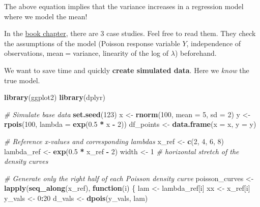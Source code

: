 \documentclass[
]{article}
\newenvironment{Shaded}{\begin{snugshade}}{\end{snugshade}}
\newcommand{\AttributeTok}[1]{\textcolor[rgb]{0.13,0.29,0.53}{#1}}
\newcommand{\CommentTok}[1]{\textcolor[rgb]{0.56,0.35,0.01}{\textit{#1}}}
\newcommand{\ControlFlowTok}[1]{\textcolor[rgb]{0.13,0.29,0.53}{\textbf{#1}}}
\newcommand{\DecValTok}[1]{\textcolor[rgb]{0.00,0.00,0.81}{#1}}
\newcommand{\FloatTok}[1]{\textcolor[rgb]{0.00,0.00,0.81}{#1}}
\newcommand{\FunctionTok}[1]{\textcolor[rgb]{0.13,0.29,0.53}{\textbf{#1}}}
\newcommand{\NormalTok}[1]{#1}
\newcommand{\OtherTok}[1]{\textcolor[rgb]{0.56,0.35,0.01}{#1}}
\newcommand{\SpecialCharTok}[1]{\textcolor[rgb]{0.81,0.36,0.00}{\textbf{#1}}}
\begin{document}
The above equation implies that the variance increases in a regression
model where we model the mean!

In the
\href{https://bookdown.org/roback/bookdown-BeyondMLR/ch-poissonreg.html}{book
chapter}, there are 3 case studies. Feel free to read them. They check
the assumptions of the model (Poisson response variable \(Y\),
independence of observations, mean\(=\)variance, linearity of the log of
\(\lambda\)) beforehand.

We want to save time and quickly \textbf{create simulated data}. Here we
\emph{know} the true model.

\begin{Shaded}
\begin{Highlighting}[]
\FunctionTok{library}\NormalTok{(ggplot2)}
\FunctionTok{library}\NormalTok{(dplyr)}

\CommentTok{\# Simulate base data}
\FunctionTok{set.seed}\NormalTok{(}\DecValTok{123}\NormalTok{)}
\NormalTok{x }\OtherTok{\textless{}{-}} \FunctionTok{rnorm}\NormalTok{(}\DecValTok{100}\NormalTok{, }\AttributeTok{mean =} \DecValTok{5}\NormalTok{, }\AttributeTok{sd =} \DecValTok{2}\NormalTok{)}
\NormalTok{y }\OtherTok{\textless{}{-}} \FunctionTok{rpois}\NormalTok{(}\DecValTok{100}\NormalTok{, }\AttributeTok{lambda =} \FunctionTok{exp}\NormalTok{(}\FloatTok{0.5} \SpecialCharTok{*}\NormalTok{ x }\SpecialCharTok{{-}} \DecValTok{2}\NormalTok{))}
\NormalTok{df\_points }\OtherTok{\textless{}{-}} \FunctionTok{data.frame}\NormalTok{(}\AttributeTok{x =}\NormalTok{ x, }\AttributeTok{y =}\NormalTok{ y)}

\CommentTok{\# Reference x{-}values and corresponding lambdas}
\NormalTok{x\_ref }\OtherTok{\textless{}{-}} \FunctionTok{c}\NormalTok{(}\DecValTok{2}\NormalTok{, }\DecValTok{4}\NormalTok{, }\DecValTok{6}\NormalTok{, }\DecValTok{8}\NormalTok{)}
\NormalTok{lambda\_ref }\OtherTok{\textless{}{-}} \FunctionTok{exp}\NormalTok{(}\FloatTok{0.5} \SpecialCharTok{*}\NormalTok{ x\_ref }\SpecialCharTok{{-}} \DecValTok{2}\NormalTok{)}
\NormalTok{width }\OtherTok{\textless{}{-}} \DecValTok{1}  \CommentTok{\# horizontal stretch of the density curves}

\CommentTok{\# Generate only the right half of each Poisson density curve}
\NormalTok{poisson\_curves }\OtherTok{\textless{}{-}} \FunctionTok{lapply}\NormalTok{(}\FunctionTok{seq\_along}\NormalTok{(x\_ref), }\ControlFlowTok{function}\NormalTok{(i) \{}
\NormalTok{  lam }\OtherTok{\textless{}{-}}\NormalTok{ lambda\_ref[i]}
\NormalTok{  xx }\OtherTok{\textless{}{-}}\NormalTok{ x\_ref[i]}
\NormalTok{  y\_vals }\OtherTok{\textless{}{-}} \DecValTok{0}\SpecialCharTok{:}\DecValTok{20}
\NormalTok{  d\_vals }\OtherTok{\textless{}{-}} \FunctionTok{dpois}\NormalTok{(y\_vals, lam)}
  

\end{Highlighting}
\end{Shaded}
\end{document}
